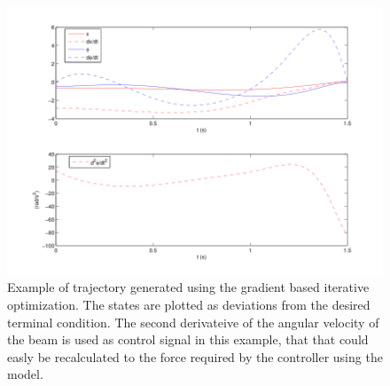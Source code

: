 \begin{figure}[\textwidth]
\centering
\includegraphics[width=\textwidth]{ballbeammatlab}
\caption{Example of trajectory generated using the gradient based iterative optimization. The states are plotted as deviations from the desired terminal condition. The second derivateive of the angular velocity of the beam is used as control signal in this example, that that could easly be recalculated to the force required by the controller using the model.}
\label{fig:matlabtrajectory}
\end{figure}